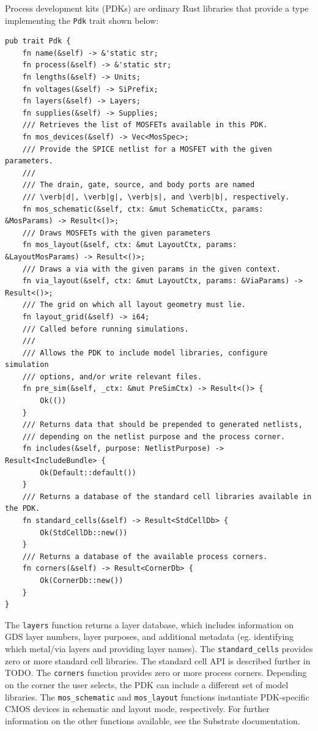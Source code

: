 Process development kits (PDKs) are ordinary Rust libraries that provide a type implementing the \verb|Pdk| trait shown below:

\begin{verbatim}
pub trait Pdk {
    fn name(&self) -> &'static str;
    fn process(&self) -> &'static str;
    fn lengths(&self) -> Units;
    fn voltages(&self) -> SiPrefix;
    fn layers(&self) -> Layers;
    fn supplies(&self) -> Supplies;
    /// Retrieves the list of MOSFETs available in this PDK.
    fn mos_devices(&self) -> Vec<MosSpec>;
    /// Provide the SPICE netlist for a MOSFET with the given parameters.
    ///
    /// The drain, gate, source, and body ports are named
    /// \verb|d|, \verb|g|, \verb|s|, and \verb|b|, respectively.
    fn mos_schematic(&self, ctx: &mut SchematicCtx, params: &MosParams) -> Result<()>;
    /// Draws MOSFETs with the given parameters
    fn mos_layout(&self, ctx: &mut LayoutCtx, params: &LayoutMosParams) -> Result<()>;
    /// Draws a via with the given params in the given context.
    fn via_layout(&self, ctx: &mut LayoutCtx, params: &ViaParams) -> Result<()>;
    /// The grid on which all layout geometry must lie.
    fn layout_grid(&self) -> i64;
    /// Called before running simulations.
    ///
    /// Allows the PDK to include model libraries, configure simulation
    /// options, and/or write relevant files.
    fn pre_sim(&self, _ctx: &mut PreSimCtx) -> Result<()> {
        Ok(())
    }
    /// Returns data that should be prepended to generated netlists,
    /// depending on the netlist purpose and the process corner.
    fn includes(&self, purpose: NetlistPurpose) -> Result<IncludeBundle> {
        Ok(Default::default())
    }
    /// Returns a database of the standard cell libraries available in the PDK.
    fn standard_cells(&self) -> Result<StdCellDb> {
        Ok(StdCellDb::new())
    }
    /// Returns a database of the available process corners.
    fn corners(&self) -> Result<CornerDb> {
        Ok(CornerDb::new())
    }
}
\end{verbatim}

The \verb|layers| function returns a layer database, which includes information on GDS layer numbers, layer purposes, and additional metadata (eg. identifying which metal/via layers and providing layer names).
The \verb|standard_cells| provides zero or more standard cell libraries. The standard cell API is described further in TODO.
The \verb|corners| function provides zero or more process corners. Depending on the corner the user selects, the PDK can include a different set of model libraries.
The \verb|mos_schematic| and \verb|mos_layout| functions instantiate PDK-specific CMOS devices in schematic and layout mode, respectively.
For further information on the other functions available, see the Substrate documentation.

